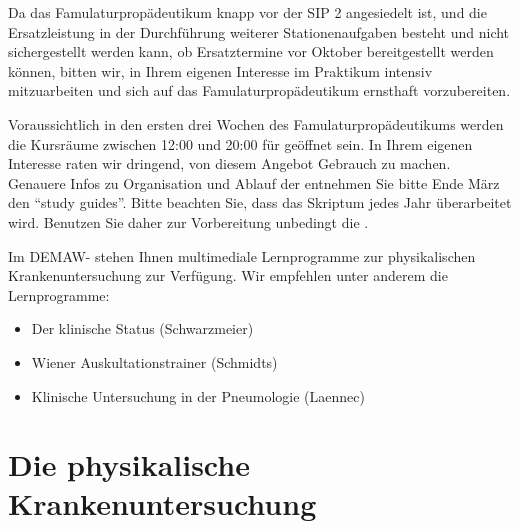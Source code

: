 {%
Da das Famulaturpropädeutikum knapp vor der SIP 2
angesiedelt ist, und die Ersatzleistung in der Durchführung
weiterer Stationenaufgaben besteht und nicht sichergestellt
werden kann, ob Ersatztermine vor Oktober bereitgestellt
werden können, bitten wir, in Ihrem eigenen Interesse im
Praktikum intensiv mitzuarbeiten und sich auf das
Famulaturpropädeutikum ernsthaft vorzubereiten.

Voraussichtlich in den ersten drei Wochen des
Famulaturpropädeutikums werden die Kursräume  zwischen 12:00 und 20:00 für
 geöffnet sein. In Ihrem eigenen
Interesse raten wir dringend, von diesem Angebot Gebrauch zu machen. Genauere Infos zu Organisation und
Ablauf der  entnehmen Sie bitte Ende
März den \enquote{study guides}.
Bitte beachten Sie, dass das Skriptum jedes Jahr
überarbeitet wird. Benutzen Sie daher zur Vorbereitung
unbedingt die .}
{}
{}
{}
{}




{Im DEMAW- stehen Ihnen multimediale
Lernprogramme zur physikalischen Krankenuntersuchung zur Verfügung.
Wir empfehlen unter anderem die Lernprogramme:

\begin{itemize}
  \item Der klinische Status (Schwarzmeier)
  \item Wiener Auskultationstrainer (Schmidts)
  \item Klinische Untersuchung in der Pneumologie (Laennec)
\end{itemize}
% 
% 
}{}{}{}{}

\begin{Literary}


\end{Literary}








\section{Die physikalische Krankenuntersuchung}

